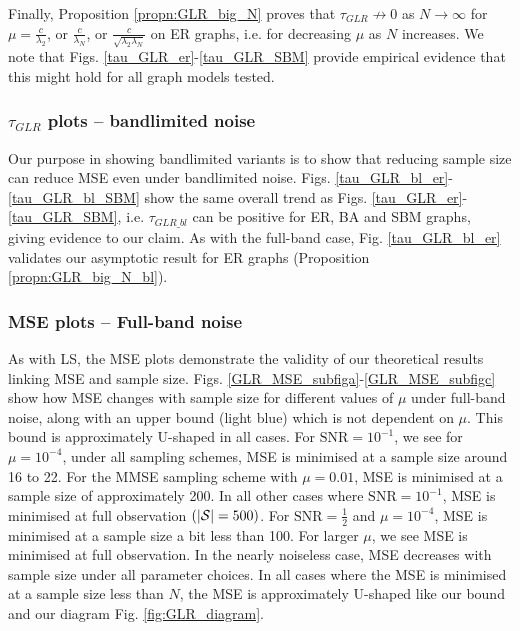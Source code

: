 Finally, Proposition \ref{propn:GLR_big_N} proves that $\tau_{GLR} \not\to 0$ as $N \to \infty$ for $\mu = \frac{c}{\lambda_{2}}$,  or $\frac{c}{\lambda_{N}}$, or $\frac{c}{\sqrt{\lambda_{2}\lambda_{N}} }$ on ER graphs, i.e. for decreasing $\mu$ as $N$ increases. We note that Figs. \ref{tau_GLR_er}-\ref{tau_GLR_SBM}  provide empirical evidence that this might hold for all graph models tested.


\subsubsection{$\tau_{GLR}$ plots -- bandlimited noise}



Our purpose in showing bandlimited variants is to show that reducing sample size can reduce MSE even under bandlimited noise. Figs. \ref{tau_GLR_bl_er}- \ref{tau_GLR_bl_SBM} show the same overall trend as Figs. \ref{tau_GLR_er}-\ref{tau_GLR_SBM}, i.e. $\tau_{GLR\_bl}$ can be positive for ER, {\color{black} BA} and SBM graphs, giving evidence to our claim. As with the full-band case, Fig. \ref{tau_GLR_bl_er} validates our asymptotic result for ER graphs (Proposition \ref{propn:GLR_big_N_bl}).



\subsubsection{MSE plots -- Full-band noise}
As with LS, the MSE plots demonstrate the validity of our theoretical results linking MSE and sample size.
Figs. \ref{GLR_MSE_subfiga}-\ref{GLR_MSE_subfigc} show how MSE changes with sample size for different values of $\mu$ under full-band noise, along with an upper bound (light blue) which is not dependent on $\mu$. This bound is approximately U-shaped in all cases.
    For $\text{SNR} = 10^{-1}$, we see for $\mu=10^{-4}$, under all sampling schemes, MSE is minimised at a sample size around 16 to 22. For the MMSE sampling scheme with $\mu=0.01$, MSE is minimised at a sample size of approximately 200. In all other cases where $\text{SNR} = 10^{-1}$, MSE is minimised at full observation $(|\mathcal{S}|=500)$.
    For $\text{SNR}=\frac{1}{2}$ and $\mu=10^{-4}$, MSE is minimised at a sample size a bit less than 100. For larger $\mu$, we see MSE is minimised at full observation.
    In the nearly noiseless case, MSE decreases with sample size under all parameter choices. In all cases where the MSE is minimised at a sample size less than $N$, the MSE is approximately U-shaped like our bound {\color{black} and 
 our diagram Fig. \ref{fig:GLR_diagram}}.


